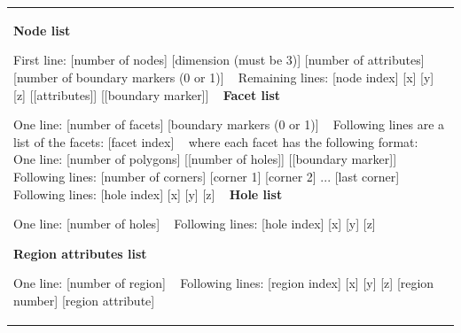 \tabulinesep=1mm
\begin{longtabu} spread 0pt [c]{*{1}{|X[-1]}|}
\hline


{\bfseries  Node list }

First line\+: \mbox{[}number of nodes\mbox{]} \mbox{[}dimension (must be 3)\mbox{]} \mbox{[}number of attributes\mbox{]} \mbox{[}number of boundary markers (0 or 1)\mbox{]} ~\newline
Remaining lines\+: \mbox{[}node index\mbox{]} \mbox{[}x\mbox{]} \mbox{[}y\mbox{]} \mbox{[}z\mbox{]} \mbox{[}\mbox{[}attributes\mbox{]}\mbox{]} \mbox{[}\mbox{[}boundary marker\mbox{]}\mbox{]} ~\newline
 {\bfseries  Facet list }

One line\+: \mbox{[}number of facets\mbox{]} \mbox{[}boundary markers (0 or 1)\mbox{]} ~\newline
Following lines are a list of the facets\+: \mbox{[}facet index\mbox{]} ~\newline
 where each facet has the following format\+: ~\newline
 One line\+: \mbox{[}number of polygons\mbox{]} \mbox{[}\mbox{[}number of holes\mbox{]}\mbox{]} \mbox{[}\mbox{[}boundary marker\mbox{]}\mbox{]} ~\newline
 Following lines\+: \mbox{[}number of corners\mbox{]} \mbox{[}corner 1\mbox{]} \mbox{[}corner 2\mbox{]} ... \mbox{[}last corner\mbox{]} ~\newline
 Following lines\+: \mbox{[}hole index\mbox{]} \mbox{[}x\mbox{]} \mbox{[}y\mbox{]} \mbox{[}z\mbox{]} ~\newline
 {\bfseries  Hole list }

One line\+: \mbox{[}number of holes\mbox{]} ~\newline
Following lines\+: \mbox{[}hole index\mbox{]} \mbox{[}x\mbox{]} \mbox{[}y\mbox{]} \mbox{[}z\mbox{]}

{\bfseries  Region attributes list }

One line\+: \mbox{[}number of region\mbox{]} ~\newline
Following lines\+: \mbox{[}region index\mbox{]} \mbox{[}x\mbox{]} \mbox{[}y\mbox{]} \mbox{[}z\mbox{]} \mbox{[}region number\mbox{]} \mbox{[}region attribute\mbox{]}

\\
\end{longtabu}


